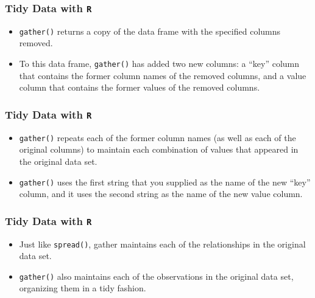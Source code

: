 \documentclass[TIDYMASTER.tex]{subfiles}
\begin{document}
\begin{frame}[fragile]
	\frametitle{Tidy Data with \texttt{R}}
	\Large
\begin{itemize}
\item \texttt{gather()} returns a copy of the data frame with the specified columns removed. 
\item To this data frame, \texttt{gather()} has added two new columns: a “key” column that contains the former column names of the removed columns, and a value column that contains the former values of the removed columns. 


\end{itemize}

\end{frame}
\begin{frame}[fragile]
	\frametitle{Tidy Data with \texttt{R}}
	\Large
\begin{itemize}
\item \texttt{gather()} repeats each of the former column names (as well as each of the original columns) to maintain each combination of values that appeared in the original data set. 
\item \texttt{gather()} uses the first string that you supplied as the name of the new “key” column, and it uses the second string as the name of the new value column.
\end{itemize}

\end{frame}
%
\begin{frame}
\frametitle{Tidy Data with \texttt{R}}
\Large
\begin{itemize}
\item Just like \texttt{spread()}, gather maintains each of the relationships in the original data set. 

\item \texttt{gather()} also maintains each of the observations in the original data set, organizing them in a tidy fashion.

\end{itemize}

\end{frame}
\end{document}
